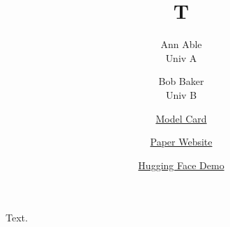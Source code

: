 \documentclass{article}
\title{T}
\author{Ann Able \\ Univ A \and Bob Baker \\ Univ B \and \href{https://x.org/card}{Model Card} \and \href{https://x.org/p}{Paper Website} \and \href{https://huggingface.co/x}{Hugging Face Demo}}
\begin{document}
\maketitle
Text.
\end{document}
